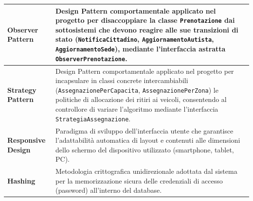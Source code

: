 \begin{center}
\begin{longtable}{|p{4.2cm}|p{10.5cm}|}
\textbf{Observer Pattern} & Design Pattern comportamentale applicato nel progetto per disaccoppiare la classe \texttt{Prenotazione} dai sottosistemi che devono reagire alle sue transizioni di stato (\texttt{NotificaCittadino}, \texttt{AggiornamentoAutista}, \texttt{AggiornamentoSede}), mediante l'interfaccia astratta \texttt{ObserverPrenotazione}. \\ \hline

\textbf{Strategy Pattern} & Design Pattern comportamentale applicato nel progetto per incapsulare in classi concrete intercambiabili (\texttt{AssegnazionePerCapacita}, \texttt{AssegnazionePerZona}) le politiche di allocazione dei ritiri ai veicoli, consentendo al controllore di variare l'algoritmo mediante l'interfaccia \texttt{StrategiaAssegnazione}. \\ \hline

\textbf{Responsive Design} & Paradigma di sviluppo dell'interfaccia utente che garantisce l'adattabilità automatica di layout e contenuti alle dimensioni dello schermo del dispositivo utilizzato (smartphone, tablet, PC). \\ \hline

\textbf{Hashing} & Metodologia crittografica unidirezionale adottata dal sistema per la memorizzazione sicura delle credenziali di accesso (password) all'interno del database. \\ \hline
\end{longtable}
\end{center}
